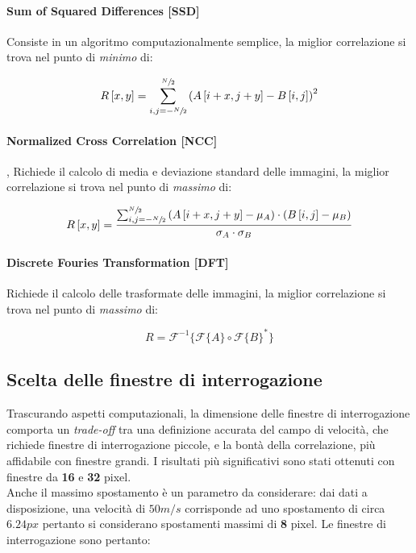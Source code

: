 \documentclass[a4paper]{article}
\begin{document}
\paragraph{Sum of Squared Differences [SSD]} Consiste in un algoritmo computazionalmente semplice, la miglior correlazione si trova nel punto di \textit{minimo} di:

\begin{equation}
R\left[x,y \right] = \sum_{i,j=-\sfrac{N}{2}}^{\sfrac{N}{2}} \left( A\left[i+x,j+y\right] - B\left[i,j \right] \right)^2
\label{eq:ssd}
\end{equation}

\paragraph{Normalized Cross Correlation [NCC]}\cite{imcorr},\cite{ncc}  Richiede il calcolo di media e deviazione standard delle immagini, la miglior correlazione si trova nel punto di \textit{massimo} di:

\begin{equation}
R\left[x,y \right] = \frac{ \sum_{i,j=-\sfrac{N}{2}}^{\sfrac{N}{2}} \left( A\left[i+x,j+y\right] - \mu_A \right) \cdot \left( B\left[i,j \right] - \mu_B \right) } { \sigma_A \cdot \sigma_B }
\label{eq:ncc}
\end{equation}


\paragraph{Discrete Fouries Transformation [DFT]} Richiede il calcolo delle trasformate delle immagini, la miglior correlazione si trova nel punto di \textit{massimo} di:

\begin{equation}
R = \mathscr{F}^{-1} \{ \mathscr{F}\{A\} \circ \mathscr{F}\{B\}^*    \}
\label{eq:dft}
\end{equation}

\subsection{Scelta delle finestre di interrogazione}

Trascurando aspetti computazionali, la dimensione delle finestre di interrogazione comporta un \textit{trade-off} tra una definizione accurata del campo di velocità, che richiede finestre di interrogazione piccole, e la bontà della correlazione, più affidabile con finestre grandi. I risultati più significativi sono stati ottenuti con finestre da \textbf{16} e \textbf{32} pixel.\\
Anche il massimo spostamento è un parametro da considerare: dai dati a disposizione, una velocità di $50 m/s$ corrisponde ad uno spostamento di circa $6.24px$ pertanto si considerano spostamenti massimi di \textbf{8} pixel. Le finestre di interrogazione sono pertanto:
\end{document}
